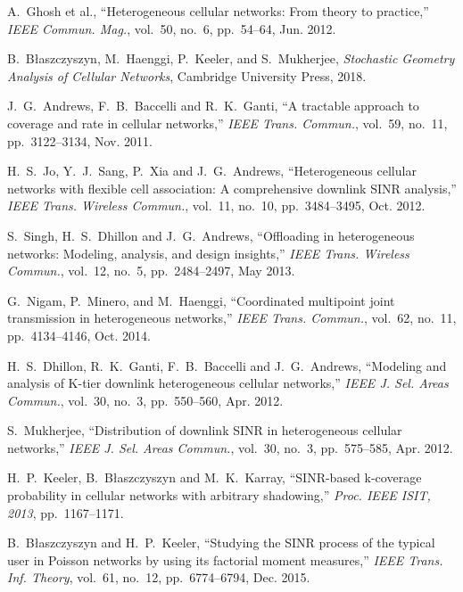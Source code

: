 \documentclass[12pt,draftclsnofoot,journal,onecolumn]{IEEEtran}
\begin{document}

\begin{thebibliography}{10}
	A.~Ghosh et al., ``{Heterogeneous cellular networks: From theory to practice},'' {\em IEEE Commun. Mag.}, vol.~50, no.~6, pp.~54--64, Jun. 2012.
	
	B.~B\l{}aszczyszyn, M.~Haenggi, P.~Keeler, and S.~Mukherjee, {\em {Stochastic Geometry Analysis of Cellular Networks}},
	 \newblock Cambridge University Press, 2018.	
	
	J.~G.~Andrews, F.~B.~Baccelli and R.~K.~Ganti, ``{A tractable approach to coverage and rate in cellular networks},'' {\em IEEE Trans. Commun.}, vol.~59, no.~11, pp.~3122--3134, Nov. 2011.

	H.~S.~Jo, Y.~J.~Sang, P.~Xia and J.~G.~Andrews, ``{Heterogeneous cellular networks with flexible cell association: A comprehensive downlink SINR analysis},'' {\em IEEE Trans. Wireless Commun.}, vol.~11, no.~10, pp.~3484--3495, Oct. 2012.	
	
	S.~Singh, H.~S.~Dhillon and J.~G.~Andrews, ``{Offloading in heterogeneous networks: Modeling, analysis, and design insights},'' {\em IEEE Trans. Wireless Commun.}, vol.~12, no.~5, pp.~2484--2497, May 2013.
	
	G.~Nigam, P.~Minero, and M.~Haenggi, ``{Coordinated multipoint joint transmission in heterogeneous networks},'' {\em IEEE Trans. Commun.}, vol.~62, 
	no.~11, pp.~4134--4146, Oct. 2014.
	
	H.~S.~Dhillon, R.~K.~Ganti, F.~B.~Baccelli and J.~G.~Andrews, ``{Modeling and analysis of K-tier downlink heterogeneous cellular networks},'' {\em IEEE J. Sel. Areas Commun.}, vol.~30, no.~3, pp.~550--560, Apr. 2012.
	
	S.~Mukherjee, ``{Distribution of downlink SINR in heterogeneous cellular networks},'' {\em IEEE J. Sel. Areas Commun.}, vol.~30, no.~3, pp.~575--585, Apr. 2012.

	 H.~P.~Keeler, B.~B\l{}aszczyszyn and M.~K.~Karray, ``{SINR-based k-coverage probability in cellular networks with arbitrary shadowing},'' {\em Proc. IEEE ISIT, 2013}, pp.~1167--1171.	
	
	B.~B\l{}aszczyszyn and H.~P.~Keeler, ``{Studying the SINR process of the typical user in Poisson networks by using its factorial moment measures},'' {\em IEEE Trans. Inf. Theory}, vol.~61, no.~12, pp.~6774--6794, Dec. 2015.
	

\end{thebibliography}
\end{document}

